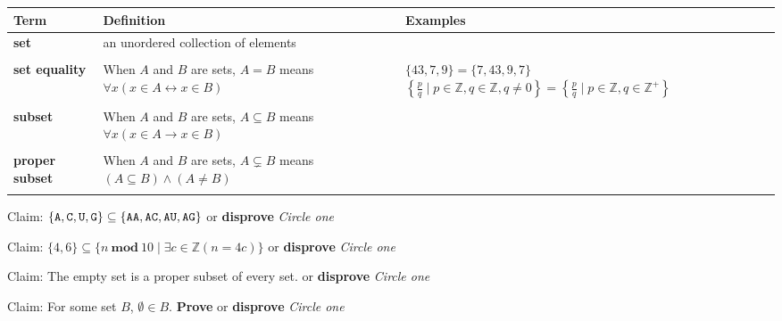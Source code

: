 \documentclass[12pt, oneside]{article}
\begin{document}
\begin{center}
\begin{tabular}{lp{2.5in}p{3.5in}}
{\bf  Term} & {\bf Definition}  & {\bf Examples} \\
\hline 
{\bf set} & an  unordered collection of  elements &  \\
&  &  \\
\hline
{\bf set  equality} & When $A$ and  $B$ are sets,  $A = B$ means  $\forall x  ( x\in A \leftrightarrow x \in B)$ & $\{ 43, 7, 9 \} = \{ 7, 43, 9, 7\}$
\newline $\left \{ \frac{p}{q} \mid p \in \mathbb{Z}, q \in \mathbb{Z}, q \neq  0 \right\} 
= \left \{ \frac{p}{q} \mid p \in \mathbb{Z}, q \in \mathbb{Z^+}\right\}$\\
&&\\
\hline
{\bf subset} & When $A$ and  $B$ are sets, $A \subseteq B$ means $\forall x  (x \in A  \to x  \in B)$ \\
&&\\
\hline
{\bf proper subset} &When $A$ and  $B$ are sets,  $A \subsetneq B$ means $(A\subseteq B) \wedge  (A \neq B)$ &
\\
&&\\
\hline
\end{tabular}
\end{center}


Claim: $\{ \texttt{A},  \texttt{C},  \texttt{U},  \texttt{G}\} \subseteq \{ \texttt{A}\texttt{A}, \texttt{A}\texttt{C}, \texttt{A}\texttt{U}, \texttt{A}\texttt{G} \}$ 
 or {\bf  disprove} \hfill{\it Circle one}

\vfill
\vfill


Claim: $\{ 4, 6 \} \subseteq \{ n ~\textbf{mod}~10 \mid  \exists c \in \mathbb{Z} ( n = 4c) \} $
 or {\bf  disprove} \hfill{\it Circle one}

\vfill
\vfill


Claim: The empty set is a proper subset of every set.
 or {\bf  disprove} \hfill{\it Circle one}

\vfill
\vfill

Claim: For  some  set $B$, $\emptyset \in B$.
\qquad
{\bf Prove} or {\bf  disprove} \hfill{\it Circle one}

\vfill
\vfill
\end{document}
